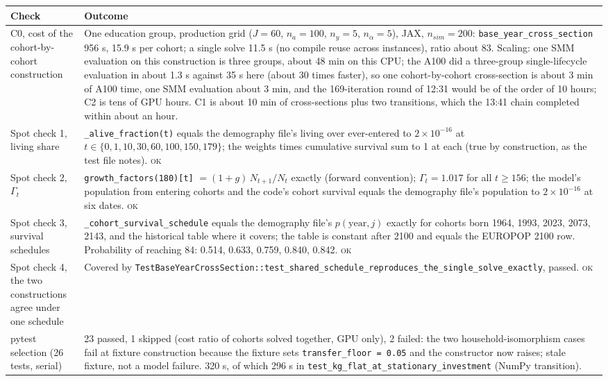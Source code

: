 \documentclass[11pt,a4paper]{article}
\newcommand{\code}[1]{\texttt{#1}}
\newcommand{\ok}{\textsc{ok}}
\begin{document}
\begin{longtable}{@{}p{4.2cm}p{11.3cm}@{}}
\toprule
Check & Outcome \\
\midrule
\endhead
C0, cost of the cohort-by-cohort construction & One education group, production grid ($J = 60$, $n_a = 100$, $n_y = 5$, $n_\alpha = 5$), JAX, $n_{sim} = 200$: \code{base_year_cross_section} 956 s, 15.9 s per cohort; a single solve 11.5 s (no compile reuse across instances), ratio about 83. Scaling: one SMM evaluation on this construction is three groups, about 48 min on this CPU; the A100 did a three-group single-lifecycle evaluation in about 1.3 s against 35 s here (about 30 times faster), so one cohort-by-cohort cross-section is about 3 min of A100 time, one SMM evaluation about 3 min, and the 169-iteration round of 12:31 would be of the order of 10 hours; C2 is tens of GPU hours. C1 is about 10 min of cross-sections plus two transitions, which the 13:41 chain completed within about an hour. \\
Spot check 1, living share & \code{_alive_fraction(t)} equals the demography file's living over ever-entered to $2\times 10^{-16}$ at $t \in \{0, 1, 10, 30, 60, 100, 150, 179\}$; the weights times cumulative survival sum to 1 at each (true by construction, as the test file notes). \ok \\
Spot check 2, $\Gamma_t$ & \code{growth_factors(180)[t]} $= (1+g)\,N_{t+1}/N_t$ exactly (forward convention); $\Gamma_t = 1.017$ for all $t \ge 156$; the model's population from entering cohorts and the code's cohort survival equals the demography file's population to $2\times 10^{-16}$ at six dates. \ok \\
Spot check 3, survival schedules & \code{_cohort_survival_schedule} equals the demography file's $p(\text{year}, j)$ exactly for cohorts born 1964, 1993, 2023, 2073, 2143, and the historical table where it covers; the table is constant after 2100 and equals the EUROPOP 2100 row. Probability of reaching 84: 0.514, 0.633, 0.759, 0.840, 0.842. \ok \\
Spot check 4, the two constructions agree under one schedule & Covered by \code{TestBaseYearCrossSection::test_shared_schedule_reproduces_the_single_solve_exactly}, passed. \ok \\
pytest selection (26 tests, serial) & 23 passed, 1 skipped (cost ratio of cohorts solved together, GPU only), 2 failed: the two household-isomorphism cases fail at fixture construction because the fixture sets \code{transfer_floor = 0.05} and the constructor now raises; stale fixture, not a model failure. 320 s, of which 296 s in \code{test_kg_flat_at_stationary_investment} (NumPy transition). \\

\end{longtable}
\end{document}
